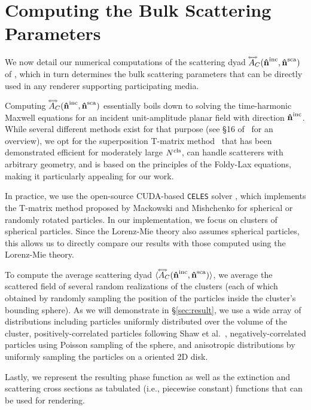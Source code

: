 \section{Computing the Bulk Scattering Parameters}
\label{sec:ours_numerical}
%
We now detail our numerical computations of the scattering dyad $\accentset{\Longleftrightarrow}{A}_C(\mathbf{\hat{n}}^{\text{inc}},\mathbf{\hat{n}}^{\text{sca}})$ of , which in turn determines the bulk scattering parameters that can be directly used in any renderer supporting participating media. 

Computing $\accentset{\Longleftrightarrow}{A}_C(\mathbf{\hat{n}}^{\text{inc}},\mathbf{\hat{n}}^{\text{sca}})$ essentially boils down to solving the time-harmonic Maxwell equations for an incident unit-amplitude planar field with direction $\mathbf{\hat{n}}^{\text{inc}}$. While several different methods exist for that purpose (see \S 16 of~\cite{mishchenko2014electromagnetic} for an overview), we opt for the superposition T-matrix method~\cite{mackowski1996calculation} that has been demonstrated efficient for moderately large ${N^\text{cls}}$, can handle scatterers with arbitrary geometry, and is based on the principles of the Foldy-Lax equations, making it particularly appealing for our work. 

In practice, we use the open-source CUDA-based \texttt{CELES} solver \cite{egel2017celes}, which implements the T-matrix method proposed by Mackowski and Mishchenko  for spherical or randomly rotated particles.
In our implementation, we focus on clusters of spherical particles.
Since the Lorenz-Mie theory also assumes spherical particles, this allows us to directly compare our results with those computed using the Lorenz-Mie theory. 

To compute the average scattering dyad ${\langle \accentset{\Longleftrightarrow}{A}_C(\mathbf{\hat{n}}^{\text{inc}},\mathbf{\hat{n}}^{\text{sca}}) \rangle}$, we average the scattered field of several random realizations of the clusters (each of which obtained by randomly sampling the position of the particles inside the cluster's bounding sphere).
As we will demonstrate in \S\ref{sec:result}, we use a wide array of distributions including particles uniformly distributed over the volume of the cluster, positively-correlated particles following Shaw et al.~, negatively-correlated particles using Poisson sampling of the sphere, and anisotropic distributions by uniformly sampling the particles on a oriented 2D disk.

Lastly, we represent the resulting phase function as well as the extinction and scattering cross sections as tabulated (i.e., piecewise constant) functions that can be used for rendering.

